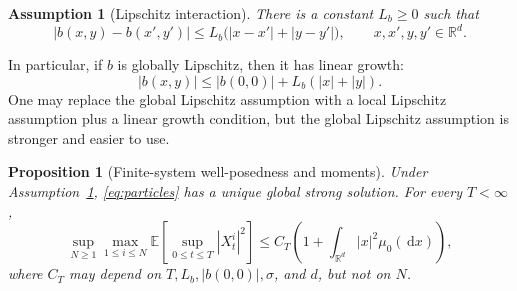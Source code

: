 \documentclass[11pt]{amsart}
\numberwithin{equation}{section}
\theoremstyle{plain}
\newtheorem{proposition}[theorem]{Proposition}
\newtheorem{assumption}[theorem]{Assumption}
\newcommand{\R}{\mathbb{R}}
\newcommand{\E}{\mathbb{E}}
\newcommand{\dd}{\,\mathrm{d}}
\newcommand{\abs}[1]{\left\lvert#1\right\rvert}
\begin{document}
\begin{assumption}[Lipschitz interaction]\label{ass:regular-mf}
There is a constant $L_b\geq0$ such that
\[
  \abs{b(x,y)-b(x',y')}
  \leq L_b\bigl(\abs{x-x'}+\abs{y-y'}\bigr),
  \qquad x,x',y,y'\in\R^d.
\]
\end{assumption}
In particular, if $b$ is globally Lipschitz, then it has linear growth:
\begin{equation}\label{eq:b-linear-growth}
  \abs{b(x,y)}\leq \abs{b(0,0)}+L_b(\abs{x}+\abs{y}).
\end{equation}
One may replace the global Lipschitz assumption with a local Lipschitz assumption plus a linear growth condition, but the global Lipschitz assumption is stronger and easier to use.

\begin{proposition}[Finite-system well-posedness and moments]
\label{prop:finite-wp}
Under Assumption~\ref{ass:regular-mf}, \eqref{eq:particles} has a unique global
strong solution.  For every $T<\infty$,
\begin{equation}\label{eq:finite-moment}
  \sup_{N\geq1}\max_{1\leq i\leq N}
  \E\left[\sup_{0\leq t\leq T}\abs{X_t^i}^2\right]
  \leq C_T\left(1+\int_{\R^d}\abs{x}^2\mu_0(\dd x)\right),
\end{equation}
where $C_T$ may depend on $T,L_b,\abs{b(0,0)},\sigma$, and $d$, but not on
$N$.
\end{proposition}
\end{document}
